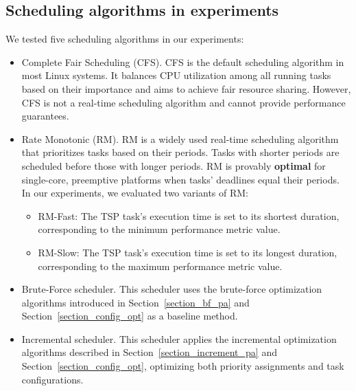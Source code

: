 	\subsection{Scheduling algorithms in experiments}
    We tested five scheduling algorithms in our experiments:
	\begin{itemize}
		\item Complete Fair Scheduling (CFS). CFS is the default scheduling algorithm in most Linux systems. It balances CPU utilization among all running tasks based on their importance and aims to achieve fair resource sharing. However, CFS is not a real-time scheduling algorithm and cannot provide performance guarantees.
		\item Rate Monotonic (RM). RM is a widely used real-time scheduling algorithm that prioritizes tasks based on their periods. Tasks with shorter periods are scheduled before those with longer periods. RM is provably \textbf{optimal} for single-core, preemptive platforms when tasks’ deadlines equal their periods.  
    In our experiments, we evaluated two variants of RM:     \begin{itemize}
        \item RM-Fast: The TSP task's execution time is set to its shortest duration, corresponding to the minimum performance metric value.
        \item RM-Slow: The TSP task's execution time is set to its longest duration, corresponding to the maximum performance metric value.
    \end{itemize}
		\item Brute-Force scheduler. 
        This scheduler uses the brute-force optimization algorithms introduced in Section~\ref{section_bf_pa} and Section~\ref{section_config_opt} as a baseline method.
		\item Incremental scheduler. 
        This scheduler applies the incremental optimization algorithms described in Section~\ref{section_increment_pa} and Section~\ref{section_config_opt}, optimizing both priority assignments and task configurations.
	\end{itemize}
	

